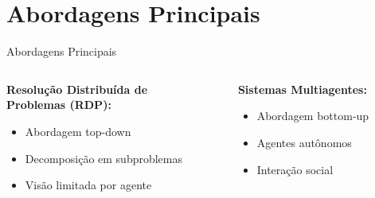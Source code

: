 \documentclass[aspectratio=169,xcolor=table]{beamer}
\begin{document}
\section{Abordagens Principais}
\begin{frame}{Abordagens Principais}
    \vspace{0.5em}
    \begin{columns}[T]
        \begin{column}{0.4\textwidth}
            \textbf{Resolução Distribuída de}\\ \textbf{Problemas (RDP):}
            \vspace{0.5em}
            \begin{itemize}\setlength{\itemsep}{0.5em}
                \item Abordagem top-down
                \item Decomposição em subproblemas
                \item Visão limitada por agente
            \end{itemize}
        \end{column}
        \hfill
        \begin{column}{0.4\textwidth}
            \textbf{Sistemas Multiagentes:}
            \vspace{0.5em}
            \begin{itemize}\setlength{\itemsep}{0.5em}
                \item Abordagem bottom-up
                \item Agentes autônomos
                \item Interação social
            \end{itemize}
        \end{column}
    \end{columns}
\end{frame}

\end{document}
